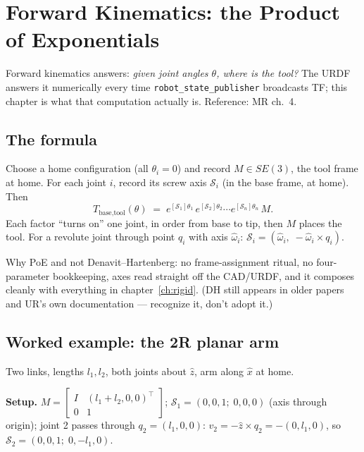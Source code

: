 \chapter{Forward Kinematics: the Product of Exponentials}
\label{ch:fk}

Forward kinematics answers: \emph{given joint angles $\theta$, where is the tool?} The URDF
answers it numerically every time \texttt{robot\_state\_publisher} broadcasts TF; this chapter
is what that computation actually is. Reference: MR ch.~4.

\section{The formula}

Choose a home configuration (all $\theta_i = 0$) and record $M \in SE(3)$, the tool frame at
home. For each joint $i$, record its screw axis $\mathcal S_i$ (in the base frame, at home).
Then
\begin{equation}
  T_{\text{base,tool}}(\theta) \;=\;
  e^{[\mathcal S_1]\theta_1}\, e^{[\mathcal S_2]\theta_2} \cdots e^{[\mathcal S_n]\theta_n}\, M .
  \label{eq:poe}
\end{equation}
Each factor ``turns on'' one joint, in order from base to tip, then $M$ places the tool. For a
revolute joint through point $q_i$ with axis $\hat\omega_i$:
$\mathcal S_i = (\hat\omega_i,\; -\hat\omega_i \times q_i)$.

Why PoE and not Denavit--Hartenberg: no frame-assignment ritual, no four-parameter bookkeeping,
axes read straight off the CAD/URDF, and it composes cleanly with everything in
chapter~\ref{ch:rigid}. (DH still appears in older papers and UR's own documentation ---
recognize it, don't adopt it.)

\section{Worked example: the 2R planar arm}
\label{sec:2r}

Two links, lengths $l_1, l_2$, both joints about $\hat z$, arm along $\hat x$ at home.

\textbf{Setup.} $M = \begin{bmatrix} I & (l_1{+}l_2, 0, 0)^\top \\ 0 & 1\end{bmatrix}$;
$\mathcal S_1 = (0,0,1;\; 0,0,0)$ (axis through origin);
joint 2 passes through $q_2 = (l_1, 0, 0)$:
$v_2 = -\hat z \times q_2 = -(0, l_1, 0)$, so $\mathcal S_2 = (0,0,1;\; 0, -l_1, 0)$.


